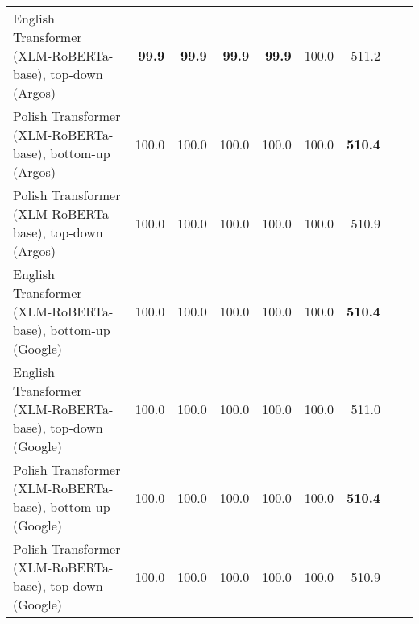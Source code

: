 \begin{table}[ht!]
{\begin{tabular}{lrrrrrrrr}
  English Transformer (XLM-RoBERTa-base), top-down (Argos) & \textbf{99.9} & \textbf{99.9} & \textbf{99.9} & \textbf{99.9} & 100.0 & 511.2 \\ 
  Polish Transformer (XLM-RoBERTa-base), bottom-up (Argos) & 100.0 & 100.0 & 100.0 & 100.0 & 100.0 & \textbf{510.4} \\ 
  Polish Transformer (XLM-RoBERTa-base), top-down (Argos) & 100.0 & 100.0 & 100.0 & 100.0 & 100.0 & 510.9 \\ 
  English Transformer (XLM-RoBERTa-base), bottom-up (Google) & 100.0 & 100.0 & 100.0 & 100.0 & 100.0 & \textbf{510.4} \\ 
  English Transformer (XLM-RoBERTa-base), top-down (Google) & 100.0 & 100.0 & 100.0 & 100.0 & 100.0 & 511.0 \\ 
  Polish Transformer (XLM-RoBERTa-base), bottom-up (Google) & 100.0 & 100.0 & 100.0 & 100.0 & 100.0 & \textbf{510.4} \\ 
  Polish Transformer (XLM-RoBERTa-base), top-down (Google) & 100.0 & 100.0 & 100.0 & 100.0 & 100.0 & 510.9 \\ 
   \hline
\end{tabular}
}
\end{table}




